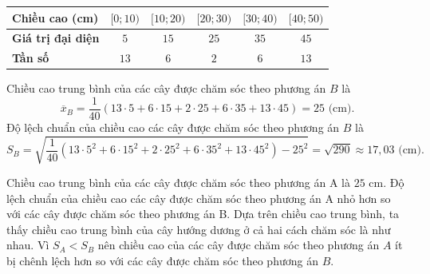 \begin{ex}[Mức độ 3]
{		\begin{center}
			\begin{tabular}{|l|c|c|c|c|c|}
				\hline
				\textbf{Chiều cao (cm)} & $[0; 10)$ & $ [10; 20)$ & $ [20; 30)$ & $ [30; 40)$ & $ [40; 50)$    \\
				\hline
				\textbf{Giá trị đại diện}&$5$ & $15$ & $25$ & $35$ & $45$  \\ \hline 
				\textbf{Tần số }&$ 13 $& $6$ & $2$ & $6$ & $13$ \\ 
				\hline
			\end{tabular}
		\end{center}
		Chiều cao trung bình của các cây được chăm sóc theo phương án $B$ là 
		$$\overline{x}_B = \dfrac{1}{40}\left(13\cdot 5 +  6\cdot 15 + 2\cdot 25 + 6\cdot 35 + 13\cdot 45\right) = 25 \textrm{ (cm)}.$$
		Độ lệch chuẩn của chiều cao các cây được chăm sóc theo phương án $B$ là 
		$$S_B = \sqrt{\dfrac{1}{40}\left(13\cdot 5^2 +  6\cdot 15^2 + 2\cdot 25^2 + 6\cdot 35^2 + 13\cdot 45^2 \right) - 25^2} = \sqrt{290} \approx 17{,}03 \textrm{ (cm)}. $$
		\begin{itemchoice}
			\itemch Chiều cao trung bình của các cây được chăm sóc theo phương án A là $25$ cm.
			\itemch Độ lệch chuẩn của chiều cao các cây được chăm sóc theo phương án A nhỏ hơn so với các cây được chăm sóc theo phương án B.
			\itemch Dựa trên chiều cao trung bình, ta thấy chiều cao trung bình của cây hướng dương ở cả hai cách chăm sóc là như nhau.
			\itemch Vì $S_A < S_B$ nên chiều cao của các cây được chăm sóc theo phương án $A$ ít bị chênh lệch hơn so với các cây được chăm sóc theo phương án $B$.
		\end{itemchoice}
	}
\end{ex}

